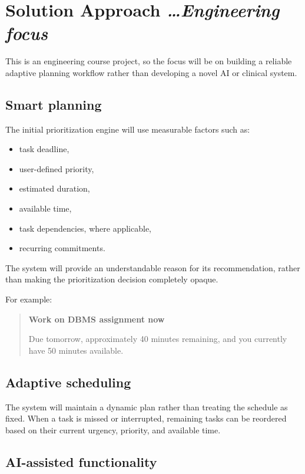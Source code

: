 \documentclass[11pt,a4paper]{article}
\newcommand{\BvrHint}[1]{%
  {\normalfont\normalsize\itshape\hfill #1}}
\begin{document}
\section{Solution Approach %
\BvrHint{\ldots Engineering focus}}

This is an engineering course project, so the focus will be on building a
reliable adaptive planning workflow rather than developing a novel AI or
clinical system.

\subsection{Smart planning}

The initial prioritization engine will use measurable factors such as:

\begin{itemize}[leftmargin=0.7cm]
    \item task deadline,
    \item user-defined priority,
    \item estimated duration,
    \item available time,
    \item task dependencies, where applicable,
    \item recurring commitments.
\end{itemize}

The system will provide an understandable reason for its recommendation,
rather than making the prioritization decision completely opaque.

For example:

\begin{quote}
\textbf{Work on DBMS assignment now}

Due tomorrow, approximately 40 minutes remaining, and
you currently have 50 minutes available.
\end{quote}

\subsection{Adaptive scheduling}

The system will maintain a dynamic plan rather than treating the schedule
as fixed. When a task is missed or interrupted, remaining tasks can be
reordered based on their current urgency, priority, and available time.

\subsection{AI-assisted functionality}
\end{document}
